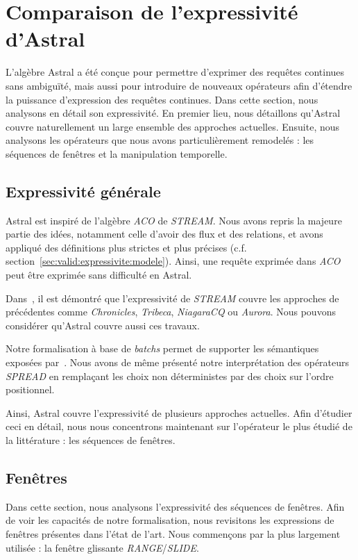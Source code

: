 \section{Comparaison de l'expressivité d'Astral}\label{sec:valid:expressivite:comparaison}
L'algèbre Astral a été conçue pour permettre d'exprimer des requêtes continues sans ambiguïté, mais aussi pour introduire de nouveaux opérateurs afin d'étendre la puissance d'expression des requêtes continues. Dans cette section, nous analysons en détail son expressivité. En premier lieu, nous détaillons qu'Astral couvre naturellement un large ensemble des approches actuelles. Ensuite, nous analysons les opérateurs que nous avons particulièrement remodelés : les séquences de fenêtres et la manipulation temporelle.

\subsection{Expressivité générale}
Astral est inspiré de l'algèbre \textit{ACO} de \textit{STREAM}. Nous avons repris la majeure partie des idées, notamment celle d'avoir des flux et des relations, et avons appliqué des définitions plus strictes et plus précises (c.f. section~\ref{sec:valid:expressivite:modele}). Ainsi, une requête exprimée dans \textit{ACO} peut être exprimée sans difficulté en Astral.

Dans~\cite{Arasu:stream}, il est démontré que l'expressivité de \textit{STREAM} couvre les approches de précédentes comme \textit{Chronicles}, \textit{Tribeca}, \textit{NiagaraCQ} ou \textit{Aurora}. Nous pouvons considérer qu'Astral couvre aussi ces travaux.

Notre formalisation à base de \textit{batchs} permet de supporter les sémantiques exposées par~\cite{Jain:spread}. Nous avons de même présenté notre interprétation des opérateurs \textit{SPREAD} en remplaçant les choix non déterministes par des choix sur l'ordre positionnel.

Ainsi, Astral couvre l'expressivité de plusieurs approches actuelles. Afin d'étudier ceci en détail, nous nous concentrons maintenant sur l'opérateur le plus étudié de la littérature : les séquences de fenêtres.

\subsection{Fenêtres}
Dans cette section, nous analysons l'expressivité des séquences de fenêtres. Afin de voir les capacités de notre formalisation, nous revisitons les expressions de fenêtres présentes dans l'état de l'art. Nous commençons par la plus largement utilisée : la fenêtre glissante \textit{RANGE}/\textit{SLIDE}.
